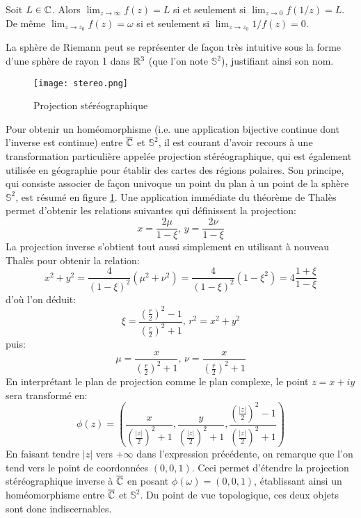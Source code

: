 \begin{fprop}
Soit $L \in \mathbb{C}$. Alors $\lim_{z \rightarrow \infty} f(z)= L$ si et seulement si $\lim_{z \rightarrow 0} f(1/z)= L$. De même $\lim_{z \rightarrow z_0} f(z)= \omega$ si et seulement si $\lim_{z \rightarrow z_0} 1/f(z)= 0$.
\end{fprop}
La sphère de Riemann peut se représenter de façon très intuitive sous la forme d'une sphère de rayon 1 dans $\mathbb R^3$ (que l'on note $\mathbb{S}^2$), justifiant ainsi son nom. 
\begin{figure}
\label{fig:stereo}
\begin{center}\texttt{[image: stereo.png]}
\end{center}
\caption{Projection stéréographique}
\end{figure}
Pour obtenir un homéomorphisme (i.e. une application bijective continue dont l'inverse est continue) entre $\overline{\mathbb{C}}$ et $\mathbb{S}^2$, il est courant d'avoir recours à une transformation particulière appelée projection stéréographique, qui est également utilisée en géographie pour établir des cartes des régions polaires. Son principe, qui consiste associer de façon univoque un point du plan à un point de la sphère $\mathbb{S}^2$, est résumé en figure \ref{fig:stereo}. Une application immédiate du théorème de Thalès permet d'obtenir les relations suivantes qui définissent la projection:
\begin{equation}
\label{eq:stereo}
x = \frac{2 \mu}{1-\xi} , \, y = \frac{2 \nu}{1-\xi}
\end{equation}
La projection inverse s'obtient tout aussi simplement en utilisant à nouveau Thalès pour obtenir la relation:
\[
x^2 + y^2 = \frac{4}{(1-\xi)^2}\left(\mu^2+\nu^2\right) = \frac{4}{(1-\xi)^2}\left(1-\xi^2\right) = 4 \frac{1+\xi}{1-\xi}
\]
d'où l'on déduit:
\[
\xi = \frac{\left(\frac{r}{2}\right)^2 -1}{\left(\frac{r}{2}\right)^2 +1}, \, r^2 = x^2 + y ^2
\]
puis:
\[
\mu = \frac{x}{\left(\frac{r}{2}\right)^2 +1}, \, \nu = \frac{x}{\left(\frac{r}{2}\right)^2 +1}
\]
En interprétant le plan de projection comme le plan complexe, le point $z = x + i y$ sera transformé en:
\[
\phi(z) = \left(\frac{x}{\left(\frac{|z|}{2}\right)^2 +1}, \frac{y}{\left(\frac{|z|}{2}\right)^2 +1},\frac{\left(\frac{|z|}{2}\right)^2 -1}{\left(\frac{|z|}{2}\right)^2 +1}\right)
\]
En faisant tendre $|z|$ vers $+\infty$ dans l'expression précédente, on remarque que l'on tend vers le point de coordonnées $(0,0,1)$. Ceci permet d'étendre la projection stéréographique inverse à $\overline{\mathbb{C}}$ en posant $\phi(\omega) = (0,0,1)$, établissant ainsi un homéomorphisme entre $\overline{\mathbb{C}}$ et $\mathbb{S}^2$. Du point de vue topologique, ces deux objets sont donc indiscernables. 
